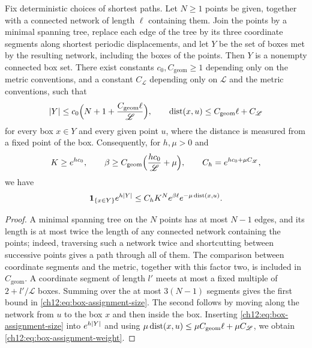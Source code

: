 \begin{lemma}\label{ch12:lem:box-assignment}
Fix deterministic choices of shortest paths. Let $N\ge1$ points be given, together with a connected network of length $\ell$ containing them. Join the points by a minimal spanning tree, replace each edge of the tree by its three coordinate segments along shortest periodic displacements, and let $Y$ be the set of boxes met by the resulting network, including the boxes of the points. Then $Y$ is a nonempty connected box set. There exist constants $c_0,C_{\mathrm{geom}}\ge1$ depending only on the metric conventions, and a constant $C_{\mathscr L}$ depending only on $\mathscr L$ and the metric conventions, such that
\begin{equation}\label{ch12:eq:box-assignment-size}
 \lvert Y\rvert\le c_0\Bigl(N+1+\frac{C_{\mathrm{geom}}\ell}{\mathscr L}\Bigr),
 \qquad \operatorname{dist}(x,u)\le C_{\mathrm{geom}}\ell+C_{\mathscr L}
\end{equation}
for every box $x\in Y$ and every given point $u$, where the distance is measured from a fixed point of the box. Consequently, for $h,\mu>0$ and
\[
 K\ge e^{hc_0},\qquad \beta\ge C_{\mathrm{geom}}\Bigl(\frac{hc_0}{\mathscr L}+\mu\Bigr),\qquad
 C_h=e^{hc_0+\mu C_{\mathscr L}},
\]
we have
\begin{equation}\label{ch12:eq:box-assignment-weight}
 \mathbf 1_{\{x\in Y\}}e^{h\lvert Y\rvert}\le C_hK^Ne^{\beta\ell}e^{-\mu\operatorname{dist}(x,u)}.
\end{equation}
\end{lemma}

\begin{proof}
A minimal spanning tree on the $N$ points has at most $N-1$ edges, and its length is at most twice the length of any connected network containing the points; indeed, traversing such a network twice and shortcutting between successive points gives a path through all of them. The comparison between coordinate segments and the metric, together with this factor two, is included in $C_{\mathrm{geom}}$. A coordinate segment of length $l'$ meets at most a fixed multiple of $2+l'/\mathscr L$ boxes. Summing over the at most $3(N-1)$ segments gives the first bound in \eqref{ch12:eq:box-assignment-size}. The second follows by moving along the network from $u$ to the box $x$ and then inside the box. Inserting \eqref{ch12:eq:box-assignment-size} into $e^{h\lvert Y\rvert}$ and using $\mu\operatorname{dist}(x,u)\le\mu C_{\mathrm{geom}}\ell+\mu C_{\mathscr L}$, we obtain \eqref{ch12:eq:box-assignment-weight}.
\end{proof}


